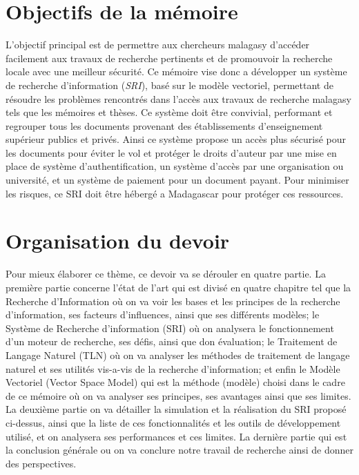 \section*{Objectifs de la mémoire}
L'objectif principal est de permettre aux chercheurs malagasy d'accéder facilement aux travaux de recherche pertinents et de promouvoir la recherche locale avec une meilleur sécurité. Ce mémoire vise donc a développer un système de recherche d'information (\emph{SRI}), basé sur le modèle vectoriel, permettant de résoudre les problèmes rencontrés dans l'accès aux travaux de recherche malagasy tels que les mémoires et thèses. Ce système doit être convivial, performant et regrouper tous les documents provenant des établissements d'enseignement supérieur publics et privés. Ainsi ce système propose un accès plus sécurisé pour les documents pour éviter le vol et protéger le droits d'auteur par une mise en place de système d'authentification, un système d'accès par une organisation ou université, et un système de paiement pour un document payant. Pour minimiser les risques, ce SRI doit être hébergé a Madagascar pour protéger ces ressources. 

\section*{Organisation du devoir}
Pour mieux élaborer ce thème, ce devoir va se dérouler en quatre partie. La première partie concerne l'état de l'art qui est divisé en quatre chapitre tel que la Recherche d'Information où on va voir les bases et les principes de la recherche d'information, ses facteurs d'influences, ainsi que ses différents modèles; le Système de Recherche d'information (SRI) où on analysera le fonctionnement d'un moteur de recherche, ses défis, ainsi que don évaluation; le Traitement de Langage Naturel (TLN) où on va analyser les méthodes de traitement de langage naturel et ses utilités vis-a-vis de la recherche d'information; et enfin le Modèle Vectoriel (Vector Space Model) qui est la méthode (modèle) choisi dans le cadre de ce mémoire où on va analyser ses principes, ses avantages ainsi que ses limites. La deuxième partie on va détailler la simulation et la réalisation du SRI proposé ci-dessus, ainsi que la liste de ces fonctionnalités et les outils de développement utilisé, et on analysera ses performances et ces limites. La dernière partie qui est la conclusion générale ou on va conclure notre travail de recherche ainsi de donner des perspectives.